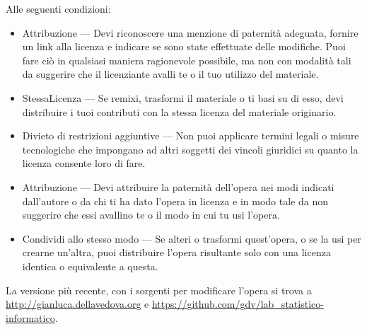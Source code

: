 \documentclass[11pt]{article}
\begin{document}
Alle seguenti condizioni:

\begin{itemize}
\item
Attribuzione — Devi riconoscere una menzione di paternità adeguata, fornire un link alla licenza e indicare se sono state effettuate delle modifiche.  Puoi fare ciò in qualsiasi maniera ragionevole possibile, ma non con modalità tali da suggerire che il licenziante avalli te o il tuo utilizzo del materiale.
\item
StessaLicenza — Se remixi, trasformi il materiale o ti basi su di esso, devi distribuire i tuoi contributi con la stessa licenza del materiale originario.
\item
Divieto di restrizioni aggiuntive — Non puoi applicare termini legali o misure tecnologiche che impongano ad altri soggetti dei vincoli giuridici su quanto la licenza consente loro di fare.
\item
Attribuzione — Devi attribuire la paternit{\`a} dell'opera nei modi indicati dall'autore o da chi ti ha dato l'opera in licenza e in modo tale da non suggerire che essi avallino te o il modo in cui tu usi l'opera.
\item
Condividi allo stesso modo — Se alteri o trasformi quest'opera, o se la usi per crearne un'altra, puoi distribuire l'opera risultante solo con una licenza identica o equivalente a  questa.
\end{itemize}

La versione più recente, con i sorgenti per modificare l'opera si trova
a \url{http://gianluca.dellavedova.org} e
\url{https://github.com/gdv/lab_statistico-informatico}.
\end{document}
